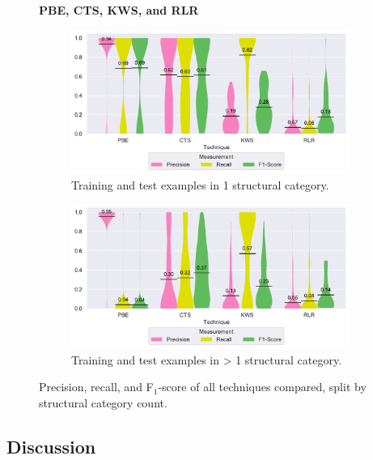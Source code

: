 \begin{figure}
\centering
    \textbf{PBE, CTS, KWS, and RLR}\par\medskip
\begin{subfigure}[b]{\columnwidth}
		\centering
				\includegraphics[width=\columnwidth,
				clip]{img/big-study/recall-precision-singlecategory-all.pdf}
		\caption{Training and test examples in 1
		structural category.}
		\label{fig:recall-precision-singlecategory-all}
\end{subfigure}\hspace{\fill}
\begin{subfigure}[b]{\columnwidth}
		\centering
				\centering
		\includegraphics[width=\columnwidth,
		clip]{img/big-study/recall-precision-multicategory-all.pdf}
		\caption{Training and test examples in \textgreater
		1 structural
		category.}
		\label{fig:recall-precision-multicategory-all}
\end{subfigure}
\caption{Precision, recall, and F$_{1}$-score of all
techniques compared, split by structural category count.}
\label{fig:category-all}
\end{figure}

\subsection{Discussion}
\label{sec:discussion}

